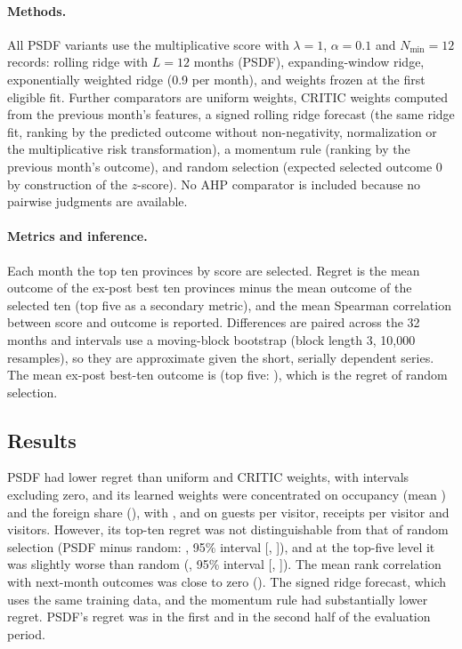 \documentclass[12pt,a4paper]{article}
\begin{document}
\paragraph{Methods.} All PSDF variants use the multiplicative score with $\lambda=1$, $\alpha=0.1$ and $N_{\min}=12$ records: rolling ridge with $L=12$ months (PSDF), expanding-window ridge, exponentially weighted ridge (0.9 per month), and weights frozen at the first eligible fit. Further comparators are uniform weights, CRITIC weights computed from the previous month's features, a signed rolling ridge forecast (the same ridge fit, ranking by the predicted outcome without non-negativity, normalization or the multiplicative risk transformation), a momentum rule (ranking by the previous month's outcome), and random selection (expected selected outcome 0 by construction of the $z$-score). No AHP comparator is included because no pairwise judgments are available.

\paragraph{Metrics and inference.} Each month the top ten provinces by score are selected. Regret is the mean outcome of the ex-post best ten provinces minus the mean outcome of the selected ten (top five as a secondary metric), and the mean Spearman correlation between score and outcome is reported. Differences are paired across the 32 months and intervals use a moving-block bootstrap (block length 3, 10{,}000 resamples), so they are approximate given the short, serially dependent series. The mean ex-post best-ten outcome is \EmpBestTen{} (top five: \EmpBestFive{}), which is the regret of random selection.

\subsection{Results}
\begin{table}[t]
\centering\small
\caption{Empirical application: selection regret in outcome $z$-score units (32 decision months, 77 provinces). Differences are relative to PSDF (rolling ridge); negative values favor the comparator. Intervals are moving-block bootstrap 95\% intervals.}\label{tab:empirical}

\end{table}
PSDF had lower regret than uniform and CRITIC weights, with intervals excluding zero, and its learned weights were concentrated on occupancy (mean \EmpWOcc) and the foreign share (\EmpWForeign), with \EmpWGuests, \EmpWReceipts{} and \EmpWVisitors{} on guests per visitor, receipts per visitor and visitors. However, its top-ten regret was not distinguishable from that of random selection (PSDF minus random: \EmpTenDiff, 95\% interval [\EmpTenLo, \EmpTenHi]), and at the top-five level it was slightly worse than random (\EmpFiveDiff, 95\% interval [\EmpFiveLo, \EmpFiveHi]). The mean rank correlation with next-month outcomes was close to zero (\EmpSpearman). The signed ridge forecast, which uses the same training data, and the momentum rule had substantially lower regret. PSDF's regret was \EmpFirstHalf{} in the first and \EmpSecondHalf{} in the second half of the evaluation period.
\end{document}
